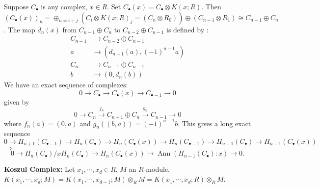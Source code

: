 \documentclass[cs4size]{article}
\newcommand{\ra}{\rightarrow}
\newcommand{\xr}{\xrightarrow}
\newcommand{\Ra}{\Rightarrow}
\DeclareMathOperator{\Ann}{Ann}
\begin{document}
Suppose $C_\bullet$ is any complex, $x\in R$. Set $C_\bullet(x)=C_\bullet\otimes K(x;R)$. Then $(C_\bullet(x))_n=\oplus_{n=i+j}(C_i\otimes K(x;R)_j=(C_n\otimes R_0))\oplus (C_{n-1}\otimes R_1)\cong C_{n-1}\oplus C_n$. The map $d_n(x)$ from $C_{n-1}\oplus C_n$ to $C_{n-2}\oplus C_{n-1}$ is defined by :
\begin{align*}
C_{n-1}&\ra C_{n-2}\oplus C_{n-1}\\
a&\mapsto (d_{n-1}(a),(-1)^{n-1}a)\\
C_n&\ra C_{n-1}\oplus C_{n-1}\\
b&\mapsto (0,d_n(b))
\end{align*}
We have an exact sequence of complexes:
\[0\ra C_\bullet \ra C_\bullet(x) \ra C_{\bullet -1}\ra 0\]
given by \[0\ra C_n\xr{f_n} C_{n-1}\oplus C_n\xr{g_n} C_{n-1}\ra 0\]
where $f_n(a)=(0,a)$ and $g_n((b,a))=(-1)^{n-1}b$. This gives a long exact sequence \[0\ra H_{n+1}(C_{\bullet -1})\ra H_n(C_\bullet )\ra H_n(C_\bullet(x))\ra H_{n}(C_{\bullet -1})\ra H_{n-1}(C_\bullet )\ra H_{n-1}(C_\bullet(x))\]
$\Ra$
\begin{equation}
0\ra H_n(C_\bullet)/xH_n(C_\bullet)\ra H_n(C_\bullet(x))\ra \Ann(H_{n-1}(C_\bullet): x)\ra 0. \label{eq:A}
\end{equation}

\textbf{Koszul Complex:} Let $x_1,\cdots,x_d\in R$, $M$ an $R$-module. $K(x_1,\cdots,x_d;M)=K(x_1,\cdots,x_{d-1};M)\otimes_RM=K(x_1,\cdots,x_d;R)\otimes_RM$.
\end{document}
